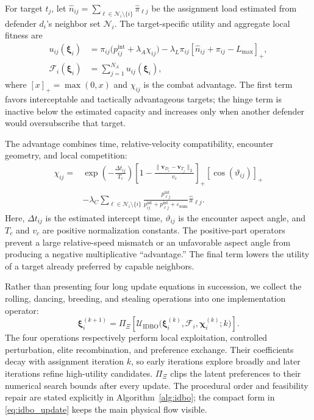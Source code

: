 For target $t_j$, let $\widehat n_{ij}=\sum_{\ell\in\mathcal N_i\setminus\{i\}}
\widehat\pi_{\ell j}$ be the assignment load estimated from defender $d_i$'s neighbor set
$\mathcal N_i$. The target-specific utility and aggregate local fitness are
\begin{equation}
\label{eq:local_utility}
\begin{aligned}
u_{ij}(\boldsymbol\xi_i)
 &=\pi_{ij}\bigl(p_{ij}^{\mathrm{int}}+\lambda_A\chi_{ij}\bigr)
 -\lambda_L\pi_{ij}
   \left[\widehat n_{ij}+\pi_{ij}-L_{\max}\right]_{+},\\
\mathcal F_i(\boldsymbol\xi_i)&=\sum_{j=1}^{N_A}u_{ij}(\boldsymbol\xi_i),
\end{aligned}
\end{equation}
where $[x]_{+}=\max(0,x)$ and $\chi_{ij}$ is the combat advantage. The first term favors
interceptable and tactically advantageous targets; the hinge term is inactive below the
estimated capacity and increases only when another defender would oversubscribe that target.

The advantage combines time, relative-velocity compatibility, encounter geometry, and local
competition:
\begin{equation}
\label{eq:adversarial_advantage}
\begin{aligned}
\chi_{ij}={}&
\exp\!\left(-\frac{\Delta t_{ij}}{T_c}\right)
\left[1-\frac{\|\mathbf v_{D_i}-\mathbf v_{T_j}\|_2}{v_c}\right]_{+}
\left[\cos(\vartheta_{ij})\right]_{+}\\
&-\lambda_C\!\sum_{\ell\in\mathcal N_i\setminus\{i\}}
\frac{p_{\ell j}^{\mathrm{int}}}
{p_{ij}^{\mathrm{int}}+p_{\ell j}^{\mathrm{int}}+\varepsilon_{\mathrm{num}}}
\widehat\pi_{\ell j}.
\end{aligned}
\end{equation}
Here, $\Delta t_{ij}$ is the estimated intercept time, $\vartheta_{ij}$ is the encounter
aspect angle, and $T_c$ and $v_c$ are positive normalization constants. The positive-part
operators prevent a large relative-speed mismatch or an unfavorable aspect angle from
producing a negative multiplicative ``advantage.'' The final term lowers the utility of a
target already preferred by capable neighbors.

Rather than presenting four long update equations in succession, we collect the rolling,
dancing, breeding, and stealing operations into one implementation operator:
\begin{equation}
\label{eq:idbo_update}
\boldsymbol\xi_i^{(k+1)}=
\Pi_{\Xi}\!\left[
\mathcal U_{\mathrm{IDBO}}
\bigl(\boldsymbol\xi_i^{(k)},\mathcal F_i,
      \boldsymbol\chi_i^{(k)};k\bigr)\right].
\end{equation}
The four operations respectively perform local exploitation, controlled perturbation, elite
recombination, and preference exchange. Their coefficients decay with assignment iteration
$k$, so early iterations explore broadly and later iterations refine high-utility candidates.
$\Pi_{\Xi}$ clips the latent preferences to their numerical search bounds after every update.
The procedural order and feasibility repair are stated explicitly in Algorithm~\ref{alg:idbo};
the compact form in \eqref{eq:idbo_update} keeps the main physical flow visible.

